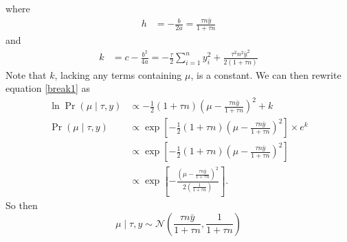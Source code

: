 \documentclass[letterpaper]{amsart}
\begin{document}
where
\begin{align}
  h &= -\frac{b}{2a}
      = \frac{\tau n\bar{y}}{1+\tau n}
\end{align}
and
\begin{align}
  k &= c-\frac{b^2}{4a}
      = -\frac{\tau}{2}
      \sum_{i=1}^n y_i^2
      +\frac{\tau^2 n^2\bar{y}^2}{2\left(1+\tau n\right)}
\end{align}
Note that $k$, lacking any terms containing $\mu$, is a constant.
We can then rewrite equation \ref{break1} as
\begin{align}
  \ln
  \Pr(\mu\mid\tau, y)
  &\propto
    -\frac{1}{2}
    \left(1+\tau n\right)
    \left(\mu - \frac{\tau n\bar{y}}{1+\tau n}\right)^2
    + k
  \\
  \Pr(\mu\mid\tau, y)
  &\propto
    \exp\left[
    -\frac{1}{2}
    \left(1+\tau n\right)
    \left(\mu - \frac{\tau n\bar{y}}{1+\tau n}\right)^2
    \right]
    \times
    e^k
  \\
  &\propto
    \exp\left[
    -\frac{1}{2}
    \left(1+\tau n\right)
    \left(\mu - \frac{\tau n\bar{y}}{1+\tau n}\right)^2
    \right]
  \\
  &\propto
    \exp\left[
    -\frac{
    \left(\mu - \frac{\tau n\bar{y}}{1+\tau n}\right)^2
    }{
    2\left(\frac{1}{1+\tau n}\right)
    }
    \right].
\end{align}
So then
\begin{equation}
  \mu\mid\tau,y
  \sim \mathcal{N}\left(\frac{\tau n\bar{y}}{1+\tau n},
\frac{1}{1+\tau n}\right)
\end{equation}
\end{document}
